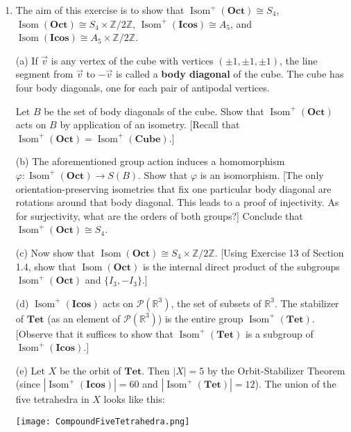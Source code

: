 \documentclass[leqno]{book}
\begin{document}
\begin{enumerate}
\item The aim of this exercise is to show that $\operatorname{Isom}^+(\mathbf{Oct})\cong S_4$, $\operatorname{Isom}(\mathbf{Oct})\cong S_4\times\mathbb Z/2\mathbb Z$, $\operatorname{Isom}^+(\mathbf{Icos})\cong A_5$, and $\operatorname{Isom}(\mathbf{Icos})\cong A_5\times\mathbb Z/2\mathbb Z$.

(a) If $\vec v$ is any vertex of the cube with vertices $(\pm 1,\pm 1,\pm 1)$, the line segment from $\vec v$ to $-\vec v$ is called a \textbf{body diagonal} of the cube.  The cube has four body diagonals, one for each pair of antipodal vertices.

Let $B$ be the set of body diagonals of the cube.  Show that $\operatorname{Isom}^+(\mathbf{Oct})$ acts on $B$ by application of an isometry.  [Recall that $\operatorname{Isom}^+(\mathbf{Oct})=\operatorname{Isom}^+(\mathbf{Cube})$.]

(b) The aforementioned group action induces a homomorphism $\varphi:\operatorname{Isom}^+(\mathbf{Oct})\to S(B)$.  Show that $\varphi$ is an isomorphism.  [The only orientation-preserving isometries that fix one particular body diagonal are rotations around that body diagonal.  This leads to a proof of injectivity.  As for surjectivity, what are the orders of both groups?]  Conclude that $\operatorname{Isom}^+(\mathbf{Oct})\cong S_4$.

(c) Now show that $\operatorname{Isom}(\mathbf{Oct})\cong S_4\times\mathbb Z/2\mathbb Z$.  [Using Exercise 13 of Section 1.4, show that $\operatorname{Isom}(\mathbf{Oct})$ is the internal direct product of the subgroups $\operatorname{Isom}^+(\mathbf{Oct})$ and $\{I_3,-I_3\}$.]

(d) $\operatorname{Isom}^+(\mathbf{Icos})$ acts on $\mathcal P(\mathbb R^3)$, the set of subsets of $\mathbb R^3$.  The stabilizer of $\mathbf{Tet}$ (as an element of $\mathcal P(\mathbb R^3)$) is the entire group $\operatorname{Isom}^+(\mathbf{Tet})$.  [Observe that it suffices to show that $\operatorname{Isom}^+(\mathbf{Tet})$ is a subgroup of $\operatorname{Isom}^+(\mathbf{Icos})$.]

(e) Let $X$ be the orbit of $\mathbf{Tet}$.  Then $|X|=5$ by the Orbit-Stabilizer Theorem (since $|\operatorname{Isom}^+(\mathbf{Icos})|=60$ and $|\operatorname{Isom}^+(\mathbf{Tet})|=12$).  The union of the five tetrahedra in $X$ looks like this:
\begin{center}
\texttt{[image: CompoundFiveTetrahedra.png]}
\end{center}


\end{enumerate}
\end{document}
